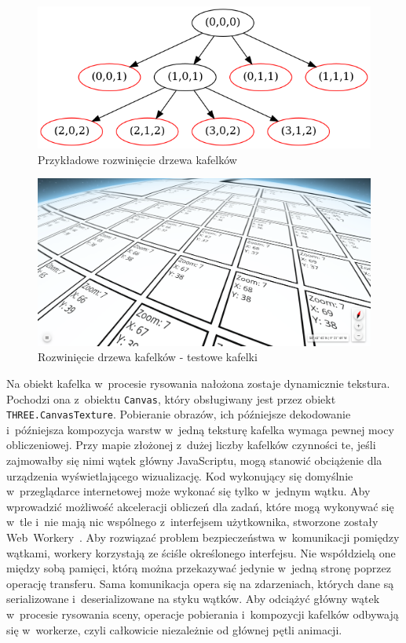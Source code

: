 \begin{figure}[h]
  \centering
  \includegraphics[scale=0.5]{diagrams/out/c4_tilesTree.png}
  \caption{Przykładowe rozwinięcie drzewa kafelków}
  \label{fig:c4_tilesTree} 
\end{figure}

\begin{figure} 
  \centering
  \includegraphics[width=\linewidth]{img/c4_osmTilesVis_custom.png}
  \caption{Rozwinięcie drzewa kafelków - testowe kafelki}
  \label{fig:c4_osmTilesVis_custom} 
\end{figure}

Na obiekt kafelka w~procesie rysowania nałożona zostaje dynamicznie tekstura. Pochodzi ona z~obiektu \texttt{Canvas}, który obsługiwany jest przez obiekt \texttt{THREE.CanvasTexture}. Pobieranie obrazów, ich późniejsze dekodowanie i~późniejsza kompozycja warstw w~jedną teksturę kafelka wymaga pewnej mocy obliczeniowej. Przy mapie złożonej z~dużej liczby kafelków czynności te, jeśli zajmowałby się nimi wątek główny JavaScriptu, mogą stanowić obciążenie dla urządzenia wyświetlającego wizualizację. Kod wykonujący się domyślnie w~przeglądarce internetowej może wykonać się tylko w~jednym wątku. Aby wprowadzić możliwość akceleracji obliczeń dla zadań, które mogą wykonywać się w~tle i~nie mają nic wspólnego z~interfejsem użytkownika, stworzone zostały Web~Workery~\cite{Workers}. Aby rozwiązać problem bezpieczeństwa w~komunikacji pomiędzy wątkami, workery korzystają ze ściśle określonego interfejsu. Nie współdzielą one między sobą pamięci, którą można przekazywać jedynie w~jedną stronę poprzez operację transferu. Sama komunikacja opera się na zdarzeniach, których dane są serializowane i~deserializowane na styku wątków. Aby odciążyć główny wątek w~procesie rysowania sceny, operacje pobierania i~kompozycji kafelków odbywają się w~workerze, czyli całkowicie niezależnie od głównej pętli animacji.

